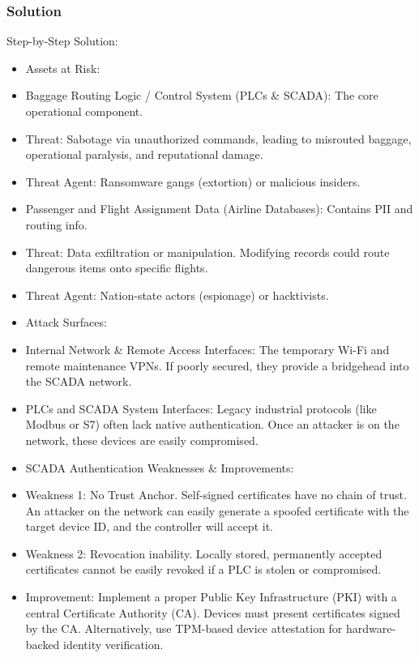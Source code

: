 \documentclass{article}
\begin{document}
\subsubsection*{Solution}
Step-by-Step Solution:

\begin{itemize}
    \item[\textbf{1.}] Assets at Risk:
    \item Baggage Routing Logic / Control System (PLCs \& SCADA): The core operational component.
    \item Threat: Sabotage via unauthorized commands, leading to misrouted baggage, operational paralysis, and reputational damage.
    \item Threat Agent: Ransomware gangs (extortion) or malicious insiders.
    \item Passenger and Flight Assignment Data (Airline Databases): Contains PII and routing info.
    \item Threat: Data exfiltration or manipulation. Modifying records could route dangerous items onto specific flights.
    \item Threat Agent: Nation-state actors (espionage) or hacktivists.

    \item[\textbf{2.}] Attack Surfaces:
    \item Internal Network \& Remote Access Interfaces: The temporary Wi-Fi and remote maintenance VPNs. If poorly secured, they provide a bridgehead into the SCADA network.
    \item PLCs and SCADA System Interfaces: Legacy industrial protocols (like Modbus or S7) often lack native authentication. Once an attacker is on the network, these devices are easily compromised.

    \item[\textbf{3.}] SCADA Authentication Weaknesses \& Improvements:
    \item Weakness 1: No Trust Anchor. Self-signed certificates have no chain of trust. An attacker on the network can easily generate a spoofed certificate with the target device ID, and the controller will accept it.
    \item Weakness 2: Revocation inability. Locally stored, permanently accepted certificates cannot be easily revoked if a PLC is stolen or compromised.
    \item Improvement: Implement a proper Public Key Infrastructure (PKI) with a central Certificate Authority (CA). Devices must present certificates signed by the CA. Alternatively, use TPM-based device attestation for hardware-backed identity verification.
\end{itemize}
\end{document}
